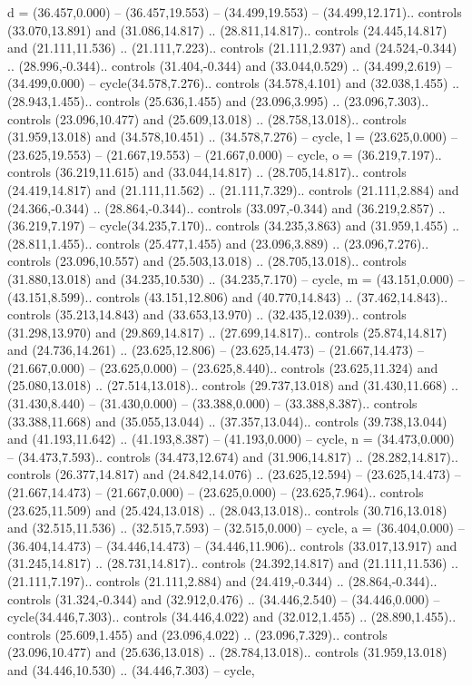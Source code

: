 {d} = {(36.457,0.000) -- (36.457,19.553) -- (34.499,19.553) -- (34.499,12.171).. controls (33.070,13.891) and (31.086,14.817) .. (28.811,14.817).. controls (24.445,14.817) and (21.111,11.536) .. (21.111,7.223).. controls (21.111,2.937) and (24.524,-0.344) .. (28.996,-0.344).. controls (31.404,-0.344) and (33.044,0.529) .. (34.499,2.619) -- (34.499,0.000) -- cycle(34.578,7.276).. controls (34.578,4.101) and (32.038,1.455) .. (28.943,1.455).. controls (25.636,1.455) and (23.096,3.995) .. (23.096,7.303).. controls (23.096,10.477) and (25.609,13.018) .. (28.758,13.018).. controls (31.959,13.018) and (34.578,10.451) .. (34.578,7.276) -- cycle},
{l} = {(23.625,0.000) -- (23.625,19.553) -- (21.667,19.553) -- (21.667,0.000) -- cycle},
{o} = {(36.219,7.197).. controls (36.219,11.615) and (33.044,14.817) .. (28.705,14.817).. controls (24.419,14.817) and (21.111,11.562) .. (21.111,7.329).. controls (21.111,2.884) and (24.366,-0.344) .. (28.864,-0.344).. controls (33.097,-0.344) and (36.219,2.857) .. (36.219,7.197) -- cycle(34.235,7.170).. controls (34.235,3.863) and (31.959,1.455) .. (28.811,1.455).. controls (25.477,1.455) and (23.096,3.889) .. (23.096,7.276).. controls (23.096,10.557) and (25.503,13.018) .. (28.705,13.018).. controls (31.880,13.018) and (34.235,10.530) .. (34.235,7.170) -- cycle},
{m} = {(43.151,0.000) -- (43.151,8.599).. controls (43.151,12.806) and (40.770,14.843) .. (37.462,14.843).. controls (35.213,14.843) and (33.653,13.970) .. (32.435,12.039).. controls (31.298,13.970) and (29.869,14.817) .. (27.699,14.817).. controls (25.874,14.817) and (24.736,14.261) .. (23.625,12.806) -- (23.625,14.473) -- (21.667,14.473) -- (21.667,0.000) -- (23.625,0.000) -- (23.625,8.440).. controls (23.625,11.324) and (25.080,13.018) .. (27.514,13.018).. controls (29.737,13.018) and (31.430,11.668) .. (31.430,8.440) -- (31.430,0.000) -- (33.388,0.000) -- (33.388,8.387).. controls (33.388,11.668) and (35.055,13.044) .. (37.357,13.044).. controls (39.738,13.044) and (41.193,11.642) .. (41.193,8.387) -- (41.193,0.000) -- cycle},
{n} = {(34.473,0.000) -- (34.473,7.593).. controls (34.473,12.674) and (31.906,14.817) .. (28.282,14.817).. controls (26.377,14.817) and (24.842,14.076) .. (23.625,12.594) -- (23.625,14.473) -- (21.667,14.473) -- (21.667,0.000) -- (23.625,0.000) -- (23.625,7.964).. controls (23.625,11.509) and (25.424,13.018) .. (28.043,13.018).. controls (30.716,13.018) and (32.515,11.536) .. (32.515,7.593) -- (32.515,0.000) -- cycle},
{a} = {(36.404,0.000) -- (36.404,14.473) -- (34.446,14.473) -- (34.446,11.906).. controls (33.017,13.917) and (31.245,14.817) .. (28.731,14.817).. controls (24.392,14.817) and (21.111,11.536) .. (21.111,7.197).. controls (21.111,2.884) and (24.419,-0.344) .. (28.864,-0.344).. controls (31.324,-0.344) and (32.912,0.476) .. (34.446,2.540) -- (34.446,0.000) -- cycle(34.446,7.303).. controls (34.446,4.022) and (32.012,1.455) .. (28.890,1.455).. controls (25.609,1.455) and (23.096,4.022) .. (23.096,7.329).. controls (23.096,10.477) and (25.636,13.018) .. (28.784,13.018).. controls (31.959,13.018) and (34.446,10.530) .. (34.446,7.303) -- cycle},
